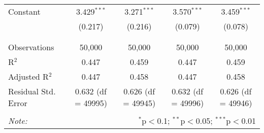 \begin{table}[!htbp]
\begin{tabular}{@{\extracolsep{5pt}}lcccc}
 Constant & 3.429$^{***}$ & 3.271$^{***}$ & 3.570$^{***}$ & 3.459$^{***}$ \\ 
  & (0.217) & (0.216) & (0.079) & (0.078) \\ 
  & & & & \\ 
\hline \\[-1.8ex] 
Observations & 50,000 & 50,000 & 50,000 & 50,000 \\ 
R$^{2}$ & 0.447 & 0.459 & 0.447 & 0.459 \\ 
Adjusted R$^{2}$ & 0.447 & 0.458 & 0.447 & 0.458 \\ 
Residual Std. Error & 0.632 (df = 49995) & 0.626 (df = 49945) & 0.632 (df = 49996) & 0.626 (df = 49946) \\ 
\hline 
\hline \\[-1.8ex] 
\textit{Note:}  & \multicolumn{4}{r}{$^{*}$p$<$0.1; $^{**}$p$<$0.05; $^{***}$p$<$0.01} \\ 
\end{tabular} 
\end{table} 
